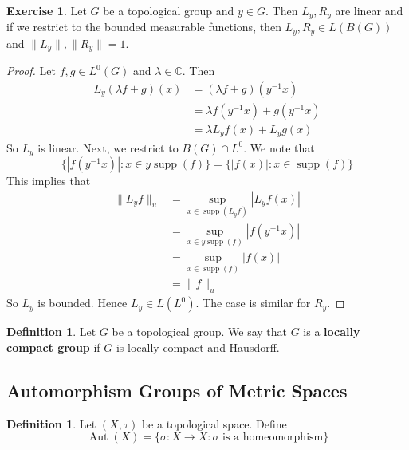\documentclass[12pt]{amsart}
\theoremstyle{definition}
\newtheorem{defn}[definition]{Definition}
\newtheorem{ex}[definition]{Exercise}
\newcommand{\lam}{\lambda}
\newcommand{\sig}{\sigma}
\newcommand{\C}{\mathbb{C}}
\DeclareMathOperator{\supp}{supp}
\DeclareMathOperator{\Aut}{Aut}
\newcommand{\lex}[1]{\label{ex:#1}}
\newcommand{\ld}[1]{\label{defn:#1}}
\begin{document}
	\begin{ex} \lex{00000} 
		Let $G$ be a topological group and $y \in G$. Then $L_y, R_y$ are linear and if we restrict to the bounded measurable functions, then  $L_y, R_y \in L(B(G))$ and $\|L_y\|, \|R_y\| = 1$. 
	\end{ex}
	
	\begin{proof}
		Let $f, g \in L^0(G)$ and $\lam \in \C$. Then 
		\begin{align*}
			L_y(\lam f+g)(x)
			& = (\lam f+g)(y^{-1}x) \\
			& = \lam f(y^{-1}x) + g(y^{-1}x) \\
			& = \lam L_yf(x) + L_yg(x)
		\end{align*}
		So $L_y$ is linear. Next, we restrict to $B(G) \cap L^0$. We note that $$\{|f(y^{-1}x)|: x \in y\supp(f)\} = \{|f(x)|: x \in \supp(f)\}$$ This implies that 
		\begin{align*}
			\|L_yf \|_u 
			& = \sup_{x \in \supp(L_yf)} |L_yf(x)| \\
			& = \sup_{x \in y\supp(f)} |f(y^{-1}x)| \\
			& = \sup_{x \in \supp(f)} |f(x)| \\ 
			& = \|f\|_u
		\end{align*} 
		So $L_y$ is bounded. Hence $L_y \in L(L^0)$. The case is similar for $R_y$.
	\end{proof}
	
	\begin{defn} \ld{00000} 
		Let $G$ be a topological group. We say that $G$ is a \textbf{locally compact group} if $G$ is locally compact and Hausdorff.
	\end{defn}
	
	
	
	
	
	
	
	
	
	
	
	
	
	
	
	
	
	
	
	
	
	
	
	
	\newpage
	\subsection{Automorphism Groups of Metric Spaces}
	
	\begin{defn} \ld{}
	Let $(X, \tau)$ be a topological space. Define $$\Aut(X) = \{\sig:X\rightarrow X: \sig \text{ is a homeomorphism} \}$$ 
	\end{defn}	
	
\end{document}
